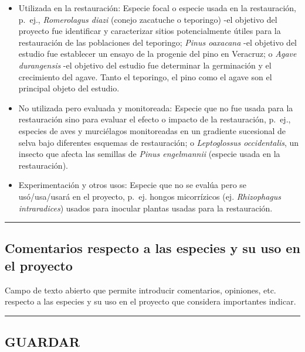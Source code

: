 \documentclass[
]{book}
\providecommand{\tightlist}{%
  \setlength{\itemsep}{0pt}\setlength{\parskip}{0pt}}
\begin{document}
\begin{itemize}
\tightlist
\item
  Utilizada en la restauración: Especie focal o especie usada en la restauración, p.~ej., \emph{Romerolagus diazi} (conejo zacatuche o teporingo) -el objetivo del proyecto fue identificar y caracterizar sitios potencialmente útiles para la restauración de las poblaciones del teporingo; \emph{Pinus oaxacana} -el objetivo del estudio fue establecer un ensayo de la progenie del pino en Veracruz; o \emph{Agave durangensis} -el objetivo del estudio fue determinar la germinación y el crecimiento del agave. Tanto el teporingo, el pino como el agave son el principal objeto del estudio.
\item
  No utilizada pero evaluada y monitoreada: Especie que no fue usada para la restauración sino para evaluar el efecto o impacto de la restauración, p.~ej., especies de aves y murciélagos monitoreadas en un gradiente sucesional de selva bajo diferentes esquemas de restauración; o \emph{Leptoglossus occidentalis}, un insecto que afecta las semillas de \emph{Pinus engelmannii} (especie usada en la restauración).
\item
  Experimentación y otros usos: Especie que no se evalúa pero se usó/usa/usará en el proyecto, p.~ej. hongos micorrízicos (ej. \emph{Rhizophagus intraradices}) usados para inocular plantas usadas para la restauración.
\end{itemize}

\begin{center}\rule{0.5\linewidth}{0.5pt}\end{center}

\hypertarget{comentarios-respecto-a-las-especies-y-su-uso-en-el-proyecto}{%
\subsection*{Comentarios respecto a las especies y su uso en el proyecto}\label{comentarios-respecto-a-las-especies-y-su-uso-en-el-proyecto}}

Campo de texto abierto que permite introducir comentarios, opiniones, etc. respecto a las especies y su uso en el proyecto que considera importantes indicar.

\begin{center}\rule{0.5\linewidth}{0.5pt}\end{center}

\hypertarget{guardar-6}{%
\subsection*{GUARDAR}\label{guardar-6}}
\end{document}
